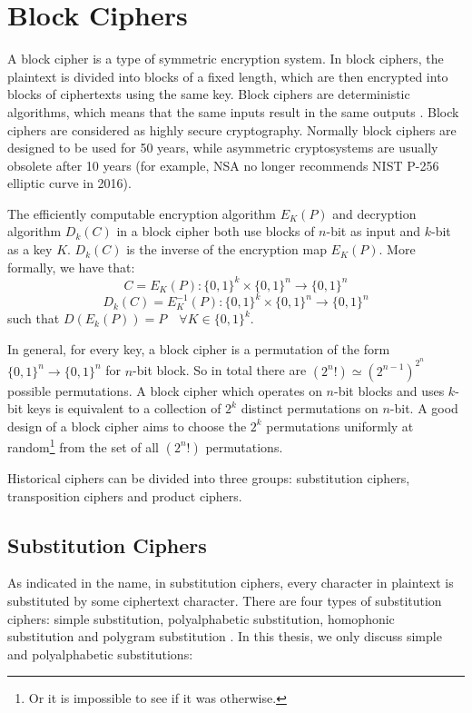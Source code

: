 \section{Block Ciphers}
A block cipher is a type of symmetric encryption system.  In block ciphers, the plaintext is divided into blocks of a fixed length, which are then encrypted into blocks of ciphertexts using the same key. Block ciphers are deterministic algorithms, which means that the same inputs result in the same outputs \cite{delfs2002introduction}. Block ciphers are considered as highly secure cryptography. Normally block ciphers are designed to be used for 50 years, while asymmetric cryptosystems are usually obsolete after 10 years (for example, NSA no longer recommends NIST P-256 elliptic curve in 2016\cite{NSA16}). 

The efficiently computable encryption algorithm $E_{K}(P)$ and decryption algorithm $D_{k}(C)$ in a block cipher both use blocks of $n$-bit as input and $k$-bit as a key $K$. $D_{k}(C)$ is the inverse of the encryption map $E_{K}(P)$. More formally, we have that: $$C = E_{K}(P) : \{0,1\}^{k} \times \{0,1\}^{n} \rightarrow \{0,1\}^{n}$$
$$D_{k}(C) = E_{K}^{-1}(P) : \{0,1\}^{k} \times \{0,1\}^{n} \rightarrow \{0,1\}^{n}$$
such that $D(E_{k}(P)) = P \quad  \forall K \in \{0,1\}^k$. 

In general, for every key, a block cipher is a permutation of the form $\{0,1\}^{n} \rightarrow \{0,1\}^{n}$ for $n$-bit block. So in total there are $(2^{n}!) \simeq (2^{n-1})^{2^{n}}$ possible permutations. A block cipher which operates on $n$-bit blocks and uses $k$-bit keys is equivalent to a collection of $2^{k}$ distinct permutations on $n$-bit. A good design of a block cipher aims to choose the $2^{k}$ permutations uniformly at random\footnote{Or it is impossible to see if it was otherwise.} from the set of all $(2^{n}!)$ permutations.

Historical ciphers can be divided into three groups: substitution ciphers, transposition ciphers and product ciphers.
\subsection{Substitution Ciphers}
As indicated in the name, in substitution ciphers, every character in plaintext is substituted by some ciphertext character. There are four types of substitution ciphers: simple substitution, polyalphabetic substitution, homophonic substitution and polygram substitution \cite{knudsen1998block}. In this thesis, we only discuss simple and polyalphabetic substitutions:

